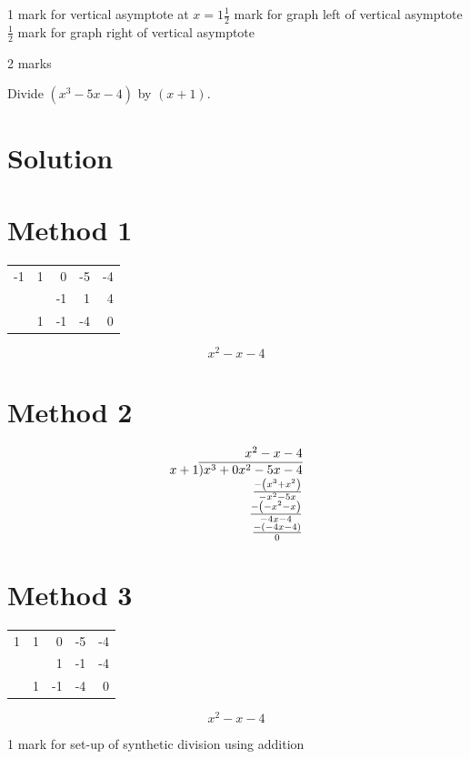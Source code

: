 \documentclass[10pt]{article}
\newcommand\longdiv[1]{\overline{\smash{)}#1}}
\begin{document}
1 mark for vertical asymptote at $x=1 \frac{1}{2}$ mark for graph left of vertical asymptote $\frac{1}{2}$ mark for graph right of vertical asymptote

2 marks

Divide $\left(x^{3}-5 x-4\right)$ by $(x+1)$.

\section*{Solution}
\section*{Method 1}
\begin{center}
\begin{tabular}{r|rrrr}
-1 & 1 & 0 & -5 & -4 \\
 &  & -1 & 1 & 4 \\
\hline
 & 1 & -1 & -4 & 0 \\
\hline
\end{tabular}
\end{center}

$$
x^{2}-x-4
$$

\section*{Method 2}
$$
\begin{array}{r}
x^{2}-x-4 \\
x + 1 \longdiv { x ^ { 3 } + 0 x ^ { 2 } - 5 x - 4 } \\
\frac{-\left(x^{3}+x^{2}\right)}{-x^{2}-5 x} \\
\frac{-\left(-x^{2}-x\right)}{-4 x-4} \\
\frac{-(-4 x-4)}{0}
\end{array}
$$

\section*{Method 3}
\begin{center}
\begin{tabular}{l|rrrr}
1 & 1 & 0 & -5 & -4 \\
 &  & 1 & -1 & -4 \\
\hline
 & 1 & -1 & -4 & 0 \\
\hline
\end{tabular}
\end{center}

$$
x^{2}-x-4
$$

1 mark for set-up of synthetic division using addition
\end{document}
